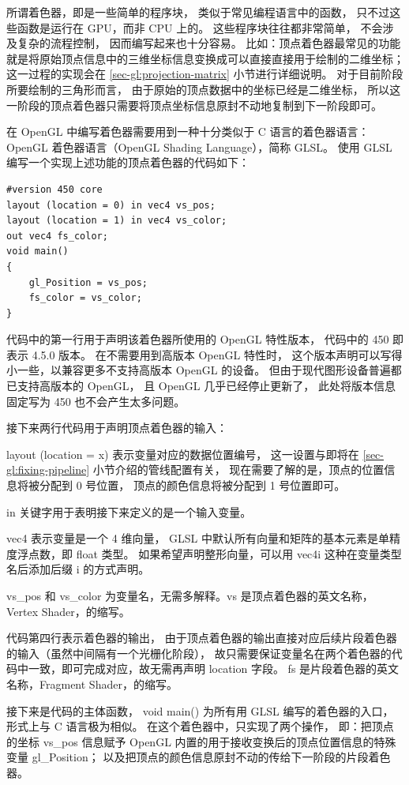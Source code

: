 \documentclass[fontset=windows]{ctexart}
\begin{document}
所谓着色器，即是一些简单的程序块，
类似于常见编程语言中的函数，
只不过这些函数是运行在 GPU，而非 CPU 上的。
这些程序块往往都非常简单，
不会涉及复杂的流程控制，
因而编写起来也十分容易。
比如：顶点着色器最常见的功能就是将原始顶点信息中的三维坐标信息变换成可以直接直接用于绘制的二维坐标；
这一过程的实现会在 \ref{sec-gl:projection-matrix} 小节进行详细说明。
对于目前阶段所要绘制的三角形而言，
由于原始的顶点数据中的坐标已经是二维坐标，
所以这一阶段的顶点着色器只需要将顶点坐标信息原封不动地复制到下一阶段即可。

在 OpenGL 中编写着色器需要用到一种十分类似于 C 语言的着色器语言：
OpenGL 着色器语言（OpenGL Shading Language），简称 GLSL。
使用 GLSL 编写一个实现上述功能的顶点着色器的代码如下：

\begin{lstlisting}
#version 450 core
layout (location = 0) in vec4 vs_pos;
layout (location = 1) in vec4 vs_color;
out vec4 fs_color;
void main()
{
    gl_Position = vs_pos;
    fs_color = vs_color;
}
\end{lstlisting}

代码中的第一行用于声明该着色器所使用的 OpenGL 特性版本，
代码中的 450 即表示 4.5.0 版本。
在不需要用到高版本 OpenGL 特性时，
这个版本声明可以写得小一些，以兼容更多不支持高版本 OpenGL 的设备。
但由于现代图形设备普遍都已支持高版本的 OpenGL，
且 OpenGL 几乎已经停止更新了，
此处将版本信息固定写为 450 也不会产生太多问题。

接下来两行代码用于声明顶点着色器的输入：

layout (location = x) 表示变量对应的数据位置编号，
这一设置与即将在 \ref{sec-gl:fixing-pipeline} 小节介绍的管线配置有关，
现在需要了解的是，顶点的位置信息将被分配到 0 号位置，
顶点的颜色信息将被分配到 1 号位置即可。

in 关键字用于表明接下来定义的是一个输入变量。

vec4 表示变量是一个 4 维向量，
GLSL 中默认所有向量和矩阵的基本元素是单精度浮点数，即 float 类型。
如果希望声明整形向量，可以用 vec4i 这种在变量类型名后添加后缀 i 的方式声明。

vs\_pos 和 vs\_color 为变量名，无需多解释。vs 是顶点着色器的英文名称，Vertex Shader，的缩写。

代码第四行表示着色器的输出，
由于顶点着色器的输出直接对应后续片段着色器的输入（虽然中间隔有一个光栅化阶段），
故只需要保证变量名在两个着色器的代码中一致，即可完成对应，故无需再声明 location 字段。
fs 是片段着色器的英文名称，Fragment Shader，的缩写。

接下来是代码的主体函数，
void main() 为所有用 GLSL 编写的着色器的入口，
形式上与 C 语言极为相似。
在这个着色器中，只实现了两个操作，
即：把顶点的坐标 vs\_pos 信息赋予 OpenGL 内置的用于接收变换后的顶点位置信息的特殊变量 gl\_Position；
以及把顶点的颜色信息原封不动的传给下一阶段的片段着色器。
\end{document}
